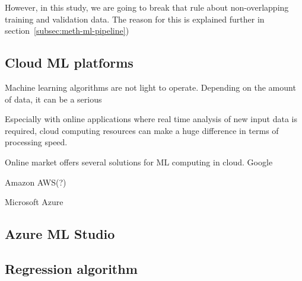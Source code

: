 However, in this study,
we are going to break that rule
about non-overlapping training and validation data.
The reason for this is explained further in section~\ref{subsec:meth-ml-pipeline})


\subsection{Cloud ML platforms}\label{subsec:bg-cloud-ml-platforms}

Machine learning algorithms are not light to operate.
Depending on the amount of data,
it can be a serious %

Especially with online applications
where real time analysis of new input data is required,
cloud computing resources can make a huge difference
in terms of processing speed. %

Online market offers several solutions for ML computing in cloud.
Google

Amazon AWS(?)

Microsoft Azure\cite{altexsoft}


\subsection{Azure ML Studio}\label{subsec:bg-azure-ml-studio-algorithms}




\subsection{Regression algorithm}\label{subsec:bg-regression-ml}

